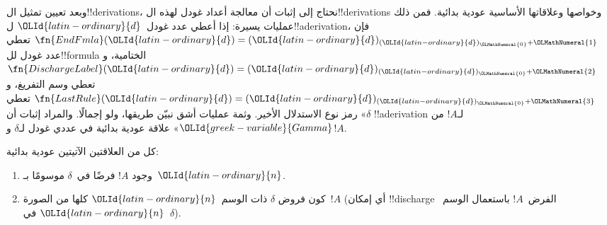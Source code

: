 \documentclass[../../../include/open-logic-section]{subfiles}
\begin{document}
\begin{explain}
وبعد تعيين تمثيل ال!!{derivation}s،
نحتاج إلى إثبات أن معالجة أعداد غودل
لهذه ال!!{derivation}s وخواصها وعلاقاتها
الأساسية عودية بدائية. فمن ذلك عمليات
يسيرة: إذا أعطي عدد غودل~${\OLId{latin-ordinary}{d}}$
ل!!a{derivation}، فإن
$\fn{EndFmla}({\OLId{latin-ordinary}{d}})=({\OLId{latin-ordinary}{d}})_{({\OLId{latin-ordinary}{d}})_{\OLMathNumeral{0}}+{\OLMathNumeral{1}}}$
تعطي عدد غودل لل!!{formula} الختامية،
و$\fn{DischargeLabel}({\OLId{latin-ordinary}{d}})=({\OLId{latin-ordinary}{d}})_{({\OLId{latin-ordinary}{d}})_{\OLMathNumeral{0}}+{\OLMathNumeral{2}}}$
تعطي وسم التفريغ،
و$\fn{LastRule}({\OLId{latin-ordinary}{d}})=({\OLId{latin-ordinary}{d}})_{({\OLId{latin-ordinary}{d}})_{\OLMathNumeral{0}}+{\OLMathNumeral{3}}}$
تعطي رمز نوع الاستدلال الأخير.
وثمة عمليات أشق نبيّن طريقها، ولو
إجمالًا. والمراد إثبات أن «$\delta$
!!a{derivation} لـ$!A$ من ${\OLId{greek-variable}{Gamma}}$»
علاقة عودية بدائية في عددي غودل
لـ$\delta$ و$!A$.
\end{explain}

\begin{prop}
  كل من العلاقتين الآتيتين عودية بدائية:
  \begin{enumerate}
  \item وجود $!A$ فرضًا في~$\delta$ موسومًا بـ~${\OLId{latin-ordinary}{n}}$.
  \item كون فروض $\delta$ ذات الوسم~${\OLId{latin-ordinary}{n}}$ كلها من الصورة~$!A$
    (أي إمكان !!{discharge} الفرض~$!A$ باستعمال الوسم~${\OLId{latin-ordinary}{n}}$ في~$\delta$).
  \end{enumerate}
\end{prop}
\end{document}
